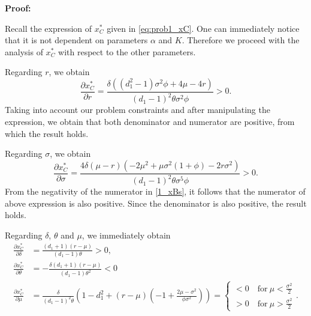 \textbf{Proof:}

Recall the expression of $x^*_C$ given in \eqref{eq:prob1_xC}. One can immediately notice that it is not dependent on parameters $\alpha$ and $K$. Therefore we proceed with the analysis of $x^*_C$ with respect to the other parameters.

Regarding $r$, we obtain
$$\frac{\partial x^*_C}{\partial r}=\frac{\delta  \left(\left(d_1^2-1\right) \sigma ^2  \phi+4 \mu -4 r\right)}{(d_1-1)^2 \theta  \sigma ^2 \phi}>0.$$
Taking into account our problem constraints and after manipulating the expression, we obtain that both denominator and numerator are positive, from which the result holds.


Regarding $\sigma$, we obtain
$$\frac{\partial x^*_C}{\partial \sigma}=\frac{4 \delta  (\mu -r) \left(-2 \mu ^2+\mu  \sigma ^2 (1+\phi)-2 r \sigma ^2\right)}{(d_1-1)^2 \theta  \sigma ^5 \phi}>0.$$
From the negativity of the numerator in  \eqref{1_xBs}, it follows that the numerator of above expression is also positive. Since the denominator is also positive, the result holds.

Regarding $\delta$, $\theta$ and $\mu$, we immediately obtain 
\begin{align*}
\frac{\partial x^*_C}{\partial \delta}&=\frac{(d_1+1) (r-\mu )}{(d_1-1) \theta }>0,\\
\frac{\partial x^*_C}{\partial \theta}&=-\frac{\delta  (d_1+1) (r-\mu )}{(d_1-1) \theta^2}<0\\
\frac{\partial x^*_C}{\partial \mu}&=\frac{\delta}{(d_1-1)^2 \theta} \left( 1-d_1^2 +(r-\mu)\left(-1+\frac{2\mu-\sigma^2}{\phi \sigma^2} \right) \right)= \begin{cases}
<0 \quad \text{for} \ \mu<\frac{\sigma^2}{2}\\
>0 \quad \text{for} \ \mu>\frac{\sigma^2}{2}
\end{cases}.
\end{align*}

